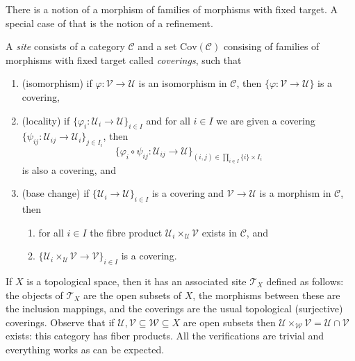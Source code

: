\noindent
There is a notion of a morphism of families of morphisms with fixed target.
A special case of that is the notion of a refinement.

\begin{definition}
\label{definition-site}
A {\it site} consists of a category $\mathcal{C}$ and a set
$\text{Cov}(\mathcal{C})$ consising of families of morphisms with fixed target 
called {\it coverings}, such that
\begin{enumerate}
\item (isomorphism) if $\varphi : \mathcal{V} \to \mathcal{U}$ is an
isomorphism in $\mathcal{C}$, then
$\{\varphi : \mathcal{V} \to \mathcal{U}\}$ is a covering,
\item (locality) if $\{\varphi_i : \mathcal{U}_i \to \mathcal{U} \}_{i\in I}$
and for all $i \in I$ we are given a covering
$\{\psi_{ij} : \mathcal{U}_{ij} \to \mathcal{U}_i \}_{j\in I_i}$, then
$$
\{\varphi_i \circ \psi_{ij} : \mathcal{U}_{ij} \to 
\mathcal{U} \}_{(i,j)\in \prod_{i\in I} \{i\} \times I_i}
$$
is also a covering, and
\item (base change) if $\{\mathcal{U}_i \to \mathcal{U} \}_{i\in I}$
is a covering and $\mathcal{V} \to \mathcal{U}$ is a morphism in
$\mathcal{C}$, then
\begin{enumerate}
\item for all $i \in I$ the fibre product
$\mathcal{U}_i \times_\mathcal{U} \mathcal{V}$ exists  in $\mathcal{C}$, and
\item  $\{\mathcal{U}_i \times_\mathcal{U} \mathcal{V} \to \mathcal{V} \}_{i\in 
I}$ is a covering.
\end{enumerate}
\end{enumerate}
\end{definition}

\begin{example}
\label{example-site-topological-space}
If $X$ is a topological space, then it has an associated site $\mathcal{T}_X$ 
defined as follows: the objects of $\mathcal{T}_X$ are the open subsets of $X$, 
the morphisms between these are the inclusion mappings, and the coverings are 
the usual topological (surjective) coverings. Observe that if $\mathcal{U}, 
\mathcal{V} \subseteq \mathcal{W} \subseteq X$ are open subsets then 
$\mathcal{U} \times_\mathcal{W} \mathcal{V} = \mathcal{U} \cap \mathcal{V}$ 
exists: this category has fiber products. All the verifications are trivial and 
everything works as can be expected. 
\end{example}





